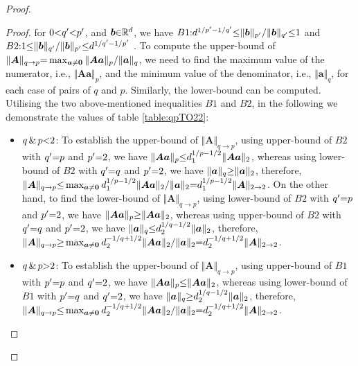 \begin{proof}
\begin{proof}
for $0 {<} q' {<} p'$, and $\boldsymbol{b} {\in} \mathbb{R}^{d}$, we have $B1 {:} d^{1/p' {-} 1/q'} {\leq} \Vert \boldsymbol{b} \Vert_{p'} {/} \Vert \boldsymbol{b} \Vert_{q'} {\leq} 1$ and $B2 {:} 1 {\leq} \Vert\boldsymbol{b} \Vert_{q'} {/} \Vert \boldsymbol{b} \Vert_{p'} {\leq} d^{1/q' {-} 1/p'}$ \cite{Golub2013}.
To compute the upper-bound of $\Vert \boldsymbol{A}\Vert_{q \to p} {=} \max_{\boldsymbol{a} \neq \boldsymbol{0}} \Vert \boldsymbol{Aa}\Vert_p {/} \Vert \boldsymbol{a}\Vert_q$, we need to find the maximum value of the numerator, i.e., $\Vert \boldsymbol{Aa}\Vert_p$, and the minimum value of the denominator, i.e., $\Vert \boldsymbol{a}\Vert_q$, for each case of pairs of $q$ and $p$.
Similarly, the lower-bound can be computed.
Utilising the two above-mentioned inequalities $B1$ and $B2$, in the following we demonstrate the values of table \ref{table:qpTO22}:
\begin{itemize}
\item ${q\, \& \, p {<} 2}$: To establish the upper-bound of $\Vert \boldsymbol{A}\Vert_{q \to p}$, using upper-bound of $B2$ with $q' {=} p$ and $p' {=} 2$, we have $\Vert \boldsymbol{Aa}\Vert_p {\leq} d_1^{1/p {-} 1/2} \Vert \boldsymbol{Aa}\Vert_2$, whereas using lower-bound of $B2$ with $q' {=} q$ and $p' {=} 2$, we have $\Vert \boldsymbol{a}\Vert_q {\geq} \Vert \boldsymbol{a}\Vert_2$, therefore, $\Vert \boldsymbol{A}\Vert_{q \to p} {\leq} \max_{\boldsymbol{a} \neq \boldsymbol{0}} d_1^{1/p {-} 1/2} \Vert \boldsymbol{Aa}\Vert_2 {/} \Vert \boldsymbol{a}\Vert_2 {=} d_1^{1/p {-} 1/2} \Vert \boldsymbol{A}\Vert_{2 \to 2}$.
On the other hand, to find the lower-bound of $\Vert \boldsymbol{A}\Vert_{q \to p}$, using lower-bound of $B2$ with $q' {=} p$ and $p' {=} 2$, we have $\Vert \boldsymbol{Aa}\Vert_p {\geq} \Vert \boldsymbol{Aa}\Vert_2$, whereas using upper-bound of $B2$ with $q' {=} q$ and $p' {=} 2$, we have $\Vert \boldsymbol{a}\Vert_q {\leq} d_2^{1/q {-} 1/2} \Vert \boldsymbol{a}\Vert_2$, therefore, $\Vert \boldsymbol{A}\Vert_{q \to p} {\geq} \max_{\boldsymbol{a} \neq \boldsymbol{0}} d_2^{-1/q {+} 1/2} \Vert \boldsymbol{Aa}\Vert_2 {/} \Vert \boldsymbol{a}\Vert_2 {=} d_2^{-1/q {+} 1/2} \Vert \boldsymbol{A}\Vert_{2 \to 2}$.
\item ${q\, \& \, p {>} 2}$: To establish the upper-bound of $\Vert \boldsymbol{A}\Vert_{q \to p}$, using upper-bound of $B1$ with $p' {=} p$ and $q' {=} 2$, we have $\Vert \boldsymbol{Aa}\Vert_p {\leq} \Vert \boldsymbol{Aa}\Vert_2$, whereas using lower-bound of $B1$ with $p' {=} q$ and $q' {=} 2$, we have $\Vert \boldsymbol{a}\Vert_q {\geq} d_2^{1/q {-} 1/2} \Vert \boldsymbol{a}\Vert_2$, therefore, $\Vert \boldsymbol{A}\Vert_{q \to p} {\leq} \max_{\boldsymbol{a} \neq \boldsymbol{0}} d_2^{-1/q {+} 1/2} \Vert \boldsymbol{Aa}\Vert_2 {/} \Vert \boldsymbol{a}\Vert_2 {=} d_2^{-1/q {+} 1/2} \Vert \boldsymbol{A}\Vert_{2 \to 2}$.

\end{itemize}
\end{proof}
\end{proof}
